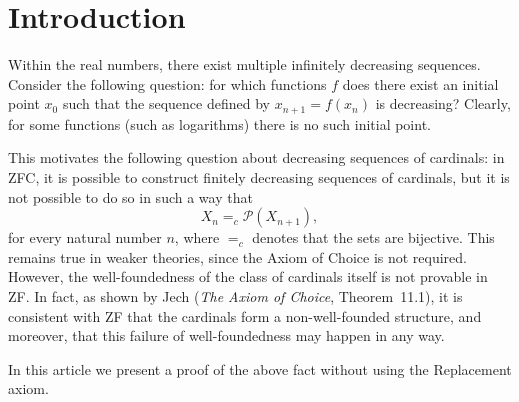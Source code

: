 \section*{Introduction}

Within the real numbers, there exist multiple infinitely decreasing sequences. Consider the following question: for which functions \(f\) does there exist an initial point \(x_0\) such that the sequence defined by \(x_{n+1} = f(x_n)\) is decreasing? Clearly, for some functions (such as logarithms) there is no such initial point.

This motivates the following question about decreasing sequences of cardinals: in ZFC, it is possible to construct finitely decreasing sequences of cardinals, but it is not possible to do so in such a way that
\[
X_n =_c \mathcal{P}(X_{n+1}),
\]
for every natural number $n$, 
where $=_c$ denotes that the sets are bijective. This remains true in weaker theories, since the Axiom of Choice is not required.
However, the well-foundedness of the class of cardinals itself is not provable in ZF. In fact, as shown by Jech (\emph{The Axiom of Choice}, Theorem~11.1), it is consistent with ZF that the cardinals form a non-well-founded structure, and moreover, that this failure of well-foundedness may happen in any way.

 In this article we present a proof of the above fact without using the Replacement axiom.